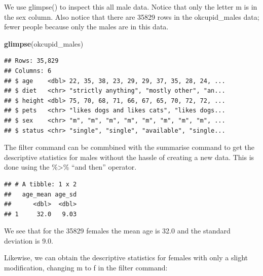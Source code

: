 \documentclass[
]{krantz}
\makeatletter
\newenvironment{Shaded}{\begin{snugshade}}{\end{snugshade}}
\newcommand{\DataTypeTok}[1]{\textcolor[rgb]{0.27,0.27,0.27}{#1}}
\newcommand{\KeywordTok}[1]{\textcolor[rgb]{0.27,0.27,0.27}{\textbf{#1}}}
\newcommand{\NormalTok}[1]{#1}
\newcommand{\OperatorTok}[1]{\textcolor[rgb]{0.43,0.43,0.43}{\textbf{#1}}}
\newcommand{\OtherTok}[1]{\textcolor[rgb]{0.37,0.37,0.37}{#1}}
\newcommand{\StringTok}[1]{\textcolor[rgb]{0.5,0.5,0.5}{#1}}
\newenvironment{kframe}{%
\medskip{}
\setlength{\fboxsep}{.8em}
 \def\at@end@of@kframe{}%
 \ifinner\ifhmode%
  \def\at@end@of@kframe{\end{minipage}}%
  \begin{minipage}{\columnwidth}%
 \fi\fi%
 \def\FrameCommand##1{\hskip\@totalleftmargin \hskip-\fboxsep
 \colorbox{shadecolor}{##1}\hskip-\fboxsep
     \hskip-\linewidth \hskip-\@totalleftmargin \hskip\columnwidth}%
 \MakeFramed {\advance\hsize-\width
   \@totalleftmargin\z@ \linewidth\hsize
   \@setminipage}}%
 {\par\unskip\endMakeFramed%
 \at@end@of@kframe}
\renewenvironment{Shaded}{\begin{kframe}}{\end{kframe}}
\makeatother
\begin{document}
We use glimpse() to inspect this all male data. Notice that only the letter m is in the sex column. Also notice that there are 35829 rows in the okcupid\_males data; fewer people because only the males are in this data.

\begin{Shaded}
\begin{Highlighting}[]
\KeywordTok{glimpse}\NormalTok{(okcupid_males)}
\end{Highlighting}
\end{Shaded}

\begin{verbatim}
## Rows: 35,829
## Columns: 6
## $ age    <dbl> 22, 35, 38, 23, 29, 29, 37, 35, 28, 24, ...
## $ diet   <chr> "strictly anything", "mostly other", "an...
## $ height <dbl> 75, 70, 68, 71, 66, 67, 65, 70, 72, 72, ...
## $ pets   <chr> "likes dogs and likes cats", "likes dogs...
## $ sex    <chr> "m", "m", "m", "m", "m", "m", "m", "m", ...
## $ status <chr> "single", "single", "available", "single...
\end{verbatim}

The filter command can be commbined with the summarise command to get the descriptive statistics for males without the hassle of creating a new data. This is done using the \%\textgreater\% ``and then'' operator.

\begin{Shaded}
\end{Shaded}

\begin{verbatim}
## # A tibble: 1 x 2
##   age_mean age_sd
##      <dbl>  <dbl>
## 1     32.0   9.03
\end{verbatim}

We see that for the 35829 females the mean age is 32.0 and the standard deviation is 9.0.

Likewise, we can obtain the descriptive statistics for females with only a slight modification, changing m to f in the filter command:
\end{document}
